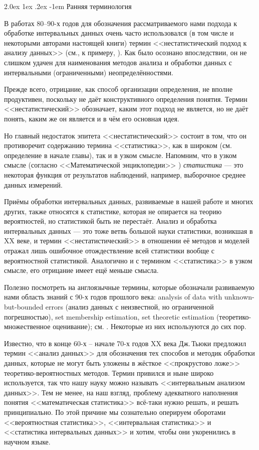 \documentclass[a5paper,openany]{book}
\makeatletter
\renewcommand\paragraph{\@startsection{paragraph}{4}{\z@}%
                         {2.0ex \@plus1ex \@minus.2ex}%
                         {-1em}%
                         {\normalfont\normalsize\bfseries}}
\makeatother
\begin{document}
\paragraph{Ранняя терминология} 
  
В работах 80--90-х годов для обозначения рассматриваемого нами подхода к обработке 
интервальных данных очень часто использовался (в том числе и некоторыми авторами 
настоящей книги) термин  <<нестатистический подход к анализу данных>> (см., к примеру, 
\cite{VoschininSotirov,VoschiBochkovSotirov,ZhilinDiss}). Как было осознано 
впоследствии, он не слишком удачен для наименования методов анализа и обработки 
данных с интервальными (ограниченными) неопределённостями. 
  
Прежде всего, отрицание, как способ организации определения, не вполне продуктивен, 
поскольку не даёт конструктивного определения понятия. Термин <<нестатистический>> 
обозначает, каким этот подход не является, но не даёт понять, каким же он является 
и в чём его основная идея. 
  
Но главный недостаток эпитета <<нестатистический>> состоит в том, что он противоречит 
содержанию термина <<статистика>>, как в широком (см. определение в начале главы), 
так и в узком смысле. Напомним, что в узком смысле (согласно <<Математической 
энциклопедии>> \cite{MathEncycl}) \emph{статистика} --- это некоторая функция 
от  результатов наблюдений, например, выборочное среднее данных измерений. 
  
Приёмы обработки интервальных данных, развиваемые в нашей работе и многих других, 
также относятся к статистике, которая не опирается на теорию вероятностей, но 
статистикой быть не перестаёт. Анализ и обработка интервальных данных --- это тоже 
ветвь большой науки статистики, возникшая в XX веке, и термин <<нестатистический>> 
в отношении её методов и моделей отражал лишь ошибочное отождествление всей статистики 
вообще с вероятностной статистикой. Аналогично и с термином <<статистика>> в узком 
смысле, его отрицание имеет ещё меньше смысла. 
  
Полезно посмотреть на англоязычные термины, которые обозначали развиваемую нами 
область знаний с 90-х годов прошлого века: analysis of data with unknown-but-bounded 
errors (анализ данных с неизвестной, но ограниченной погрешностью), set membership 
estimation, set theoretic estimation (теоретико-множественное оценивание); 
см. \cite{BoundApprHandbook}. Некоторые из них используются до сих пор. 
 
Известно, что в конце 60-х -- начале 70-х годов XX века Дж.\,Тьюки предложил термин 
<<анализ данных>> для обозначения тех способов и методик обработки данных, которые 
не могут быть уложены в жёсткое <<прокрустово ложе>> теоретико-вероятностных методов. 
Термин привился и ныне широко используется, так что нашу науку можно называть 
<<интервальным анализом данных>>. Тем не менее, на наш взгляд, проблему адекватного 
наполнения понятия <<математическая статистика>> всё-таки нужно решать, и решать 
принципиально. По этой причине мы  сознательно оперируем оборотами <<вероятностная 
статистика>>, <<интервальная статистика>> и <<статистика интервальных  данных>> 
и хотим, чтобы они укоренились в научном языке. 
  
\end{document}
